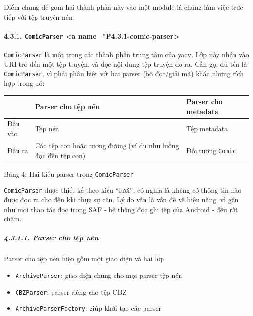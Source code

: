 \documentclass[
]{article}
\providecommand{\tightlist}{%
  \setlength{\itemsep}{0pt}\setlength{\parskip}{0pt}}
\begin{document}
Điểm chung để gom hai thành phần này vào một module là chúng làm việc
trực tiếp với tệp truyện nén.

\hypertarget{comicparser-a-namep4.3.1-comic-parser}{%
\paragraph{\texorpdfstring{4.3.1. \texttt{ComicParser} \textless a
name="P4.3.1-comic-parser\textgreater{}}{4.3.1. ComicParser \textless a name="P4.3.1-comic-parser\textgreater{}}}\label{comicparser-a-namep4.3.1-comic-parser}}

\texttt{ComicParser} là một trong các thành phần trung tâm của yacv. Lớp
này nhận vào URI trỏ đến một tệp truyện, và đọc nội dung tệp truyện đó
ra. Cần gọi đủ tên là \texttt{ComicParser}, vì phải phân biệt với hai
parser (bộ đọc/giải mã) khác nhưng tích hợp trong nó:

\begin{longtable}[]{@{}
  >{\raggedright\arraybackslash}p{}
  >{\raggedright\arraybackslash}p{}
  >{\raggedright\arraybackslash}p{}@{}}
\toprule
& Parser cho tệp nén & Parser cho metadata \\
\midrule
\endhead
Đầu vào & Tệp nén & Tệp metadata \\
Đầu ra & Các tệp con hoặc tương đương (ví dụ như luồng đọc đến tệp con)
& Đối tượng \texttt{Comic} \\
\bottomrule
\end{longtable}

Bảng 4: Hai kiểu parser trong \texttt{ComicParser}

\texttt{ComicParser} được thiết kế theo kiểu ``lười'', có nghĩa là không
có thông tin nào được đọc ra cho đến khi thực sự cần. Lý do vẫn là vấn
đề về hiệu năng, vì gần như mọi thao tác đọc trong SAF - hệ thống đọc
ghi tệp của Android - đều rất chậm.

\hypertarget{parser-cho-tux1ec7p-nuxe9n}{%
\subparagraph{4.3.1.1. Parser cho tệp
nén}\label{parser-cho-tux1ec7p-nuxe9n}}

Parser cho tệp nén hiện gồm một giao diện và hai lớp

\begin{itemize}
\tightlist
\item
  \texttt{ArchiveParser}: giao diện chung cho mọi parser tệp nén
\item
  \texttt{CBZParser}: parser riêng cho tệp CBZ
\item
  \texttt{ArchiveParserFactory}: giúp khởi tạo các parser
\end{itemize}
\end{document}
